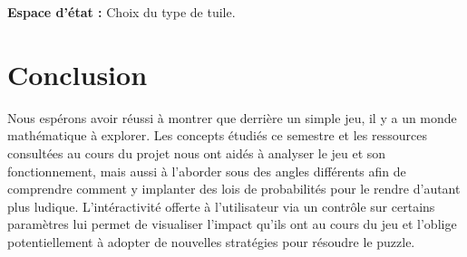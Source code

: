 \documentclass[12pt]{report}
\begin{document}
\textbf{Espace d'état :} Choix du type de tuile.

\chapter{Conclusion}

\tabto{1cm}Nous espérons avoir réussi à montrer que derrière un simple jeu, il y a un monde
mathématique à explorer. Les concepts étudiés ce semestre et les ressources consultées au
cours du projet nous ont aidés à analyser le jeu et son fonctionnement, mais aussi à l'aborder
sous des angles différents afin de comprendre comment y implanter des lois de probabilités
pour le rendre d'autant plus ludique. L'intéractivité offerte à l'utilisateur via un contrôle
sur certains paramètres lui permet de visualiser l'impact qu'ils ont au cours du jeu et l'oblige 
potentiellement à adopter de nouvelles stratégies pour résoudre le puzzle.
\end{document}

